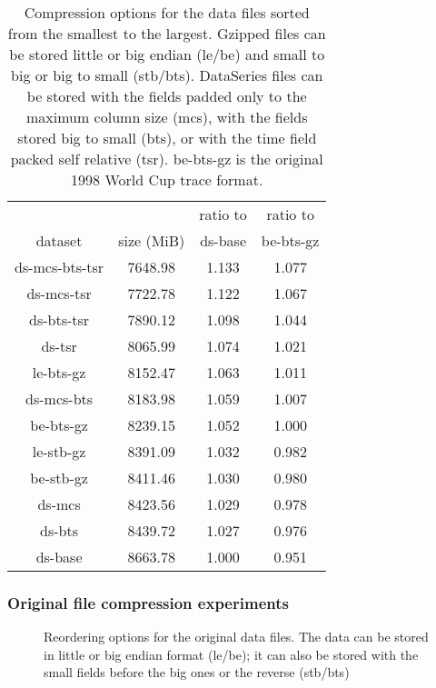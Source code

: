 \begin{table}
\centering
\begin{tabular}{|c|c|c|c|}\hline

               &            & ratio to & ratio to \\
    dataset    & size (MiB) & ds-base & be-bts-gz \\
\hline							   
ds-mcs-bts-tsr & 7648.98  & 1.133         & 1.077         \\
ds-mcs-tsr     & 7722.78  & 1.122         & 1.067         \\
ds-bts-tsr     & 7890.12  & 1.098         & 1.044         \\
ds-tsr         & 8065.99  & 1.074         & 1.021         \\
le-bts-gz      & 8152.47  & 1.063         & 1.011         \\
ds-mcs-bts     & 8183.98  & 1.059         & 1.007         \\
be-bts-gz      & 8239.15  & 1.052         & 1.000         \\
le-stb-gz      & 8391.09  & 1.032         & 0.982         \\
be-stb-gz      & 8411.46  & 1.030         & 0.980         \\
ds-mcs         & 8423.56  & 1.029         & 0.978         \\
ds-bts         & 8439.72  & 1.027         & 0.976         \\
ds-base        & 8663.78  & 1.000         & 0.951         \\
\hline
\end{tabular}


\caption{Compression options for the data files sorted from the smallest 
to the largest.  Gzipped files can be stored little or big endian
(le/be) and small to big or big to small (stb/bts).  DataSeries files
can be stored with the fields padded only to the maximum column size
(mcs), with the fields stored big to small (bts), or with the time
field packed self relative (tsr). be-bts-gz is the original 1998 World
Cup trace format.}

\label{table:wc1998:compression}
\end{table}

\subsubsection{Original file compression experiments}

\begin{figure}
\caption{Reordering options for the original data files.  
The data can be stored in little or big endian format (le/be); it can
also be stored with the small fields before the big ones or the
reverse (stb/bts)}
\label{fig:wc1998:original-data-reordering}
\end{figure}

